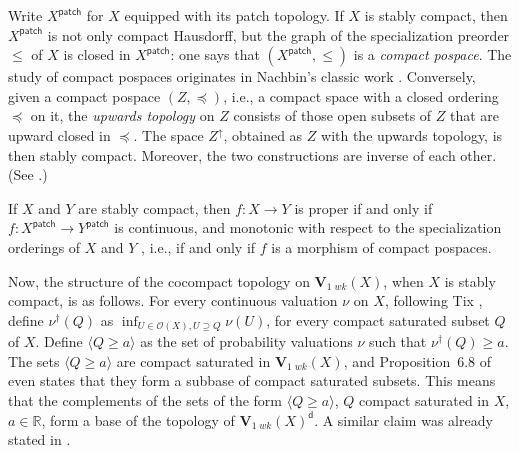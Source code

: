 \documentclass{LMCS}
\newcommand\Open{\mathcal O}
\newcommand\Val{\mathbf V}
\newcommand{\real}{\mathbb{R}}
\newcommand\dG{{\mathsf{d}}}
\newcommand\patch{{\mathsf{patch}}}
\begin{document}
Write $X^\patch$ for $X$ equipped with its patch topology.  If $X$ is
stably compact, then $X^\patch$ is not only compact Hausdorff, but the
graph of the specialization preorder $\leq$ of $X$ is closed in
$X^\patch$: one says that $(X^\patch, \leq)$ is a \emph{compact
  pospace}.  The study of compact pospaces originates in Nachbin's
classic work \cite{Nachbin:toporder}.  Conversely, given a compact
pospace $(Z, \preceq)$, i.e., a compact space with a closed ordering
$\preceq$ on it, the \emph{upwards topology} on $Z$ consists of those
open subsets of $Z$ that are upward closed in $\preceq$.  The space
$Z^\uparrow$, obtained as $Z$ with the upwards topology, is then
stably compact.  Moreover, the two constructions are inverse of each
other.  (See \cite[Section~VI-6]{GHKLMS:contlatt}.)

If $X$ and $Y$ are stably compact, then $f : X \to Y$ is proper if and
only if $f : X^\patch \to Y^\patch$ is continuous, and monotonic with
respect to the specialization orderings of $X$ and $Y$
\cite[Proposition~VI.6.23]{GHKLMS:contlatt}, i.e., if and only if $f$
is a morphism of compact pospaces.

Now, the structure of the cocompact topology on $\Val_{1\;wk} (X)$,
when $X$ is stably compact, is as follows.  For every continuous
valuation $\nu$ on $X$, following Tix \cite{Tix:bewertung}, define
$\nu^\dagger (Q)$ as $\inf_{U \in \Open (X), U \supseteq Q} \nu (U)$,
for every compact saturated subset $Q$ of $X$.
Define $\langle Q \geq a \rangle$ as the set of probability valuations
$\nu$ such that $\nu^\dagger (Q) \geq a$.  The sets $\langle Q \geq
a\rangle$ are compact saturated in $\Val_{1\;wk} (X)$, and
Proposition~6.8 of \cite{JGL-mscs09} even states that they form a
subbase of compact saturated subsets.  This means that the complements
of the sets of the form $\langle Q \geq a \rangle$, $Q$ compact
saturated in $X$, $a \in \real$, form a base of the topology of
$\Val_{1\;wk} (X)^\dG$.  A similar claim was already stated in
\cite[last lines]{Jung:scs:prob}.
\end{document}
